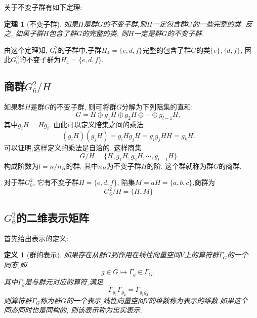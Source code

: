 \documentclass[UTF8]{ctexart}
\newtheorem{thm}{定理}
\newtheorem{define}{定义}
\begin{document}
关于不变子群有如下定理:
\begin{thm}[不变子群]
如果$H$是群$G$的不变子群,则$H$一定包含群$G$的一些完整的类. 反之, 如果子群$H$包含了群$G$的完整的类, 则$H$一定是群$G$的不变子群.
\end{thm}

由这个定理知, $G_6^2$的子群中,子群$H_4 = \{e, d, f\}$完整的包含了群$G$的类$\{e\}, \{d, f\}$, 因此$G_6^2$的不变子群为$H_4 = \{e, d, f\}$.

\subsection{商群$G_6^2 / H$}
如果群$H$是群$G$的不变子群, 则可将群$G$分解为下列陪集的直和:
\begin{equation}
G = H \oplus g_1 H \oplus g_2 H \oplus \cdots \oplus g_{l-1}H,
\end{equation}
其中$g_i H = H g_i$. 由此可以定义陪集之间的乘法
\begin{equation}
(g_i H)(g_j H) = g_i H g_j H = g_i g_j H H = g_k H.
\end{equation}
可以证明,这样定义的乘法是自洽的. 这样商集
\begin{equation}
G / H = \{H, g_1 H, g_2 H, \cdots , g_{l-1} H\}
\end{equation}
构成阶数为$l = n / n_H$的群, 其中$n_H$为不变子群$H$的阶, 这个群就称为群$G$的商群.

对于群$G_6^2$, 它有不变子群$H = \{e, d, f\}$, 陪集$M = a H = \{a, b, c\}$,商群为
\begin{equation}
G_6^2 / H = \{H,M\}
\end{equation}

\subsection{$G_6^2$的二维表示矩阵}
首先给出表示的定义:
\begin{define}[群的表示]
如果存在从群$G$到作用在线性向量空间$V$上的算符群$\varGamma_G$的一个同态,即
\begin{equation}
g \in G \mapsto \varGamma_g \in \varGamma_G,
\end{equation}
其中$\varGamma_g$是与群元对应的算符,满足
\begin{equation}
\varGamma_{g_1}\varGamma_{g_2} = \varGamma_{g_1 g_2}
\end{equation}
则算符群$\varGamma_G$称为群$G$的一个表示,线性向量空间$V$的维数称为表示的维数.如果这个同态同时也是同构的, 则该表示称为忠实表示.
\end{define}
\end{document}
